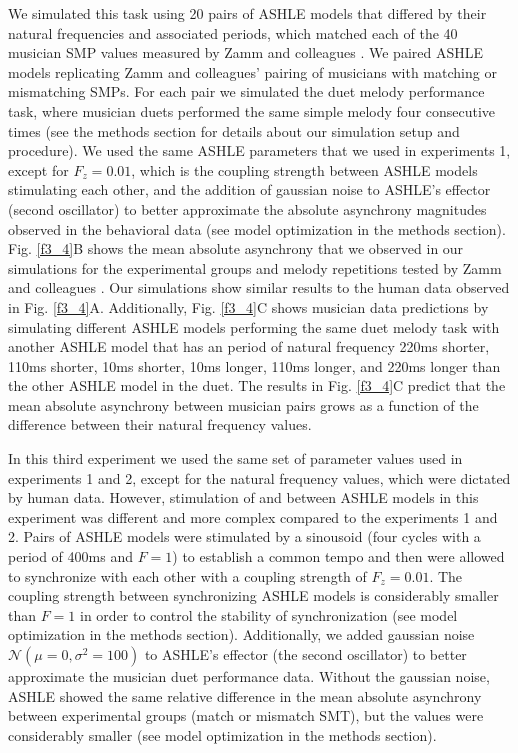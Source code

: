 \documentclass{report}
\begin{document}
We simulated this task using 20 pairs of ASHLE models that differed by their natural frequencies and associated periods, which matched each of the 40 musician SMP values measured by Zamm and colleagues \cite{zamm2016endogenous}. We paired ASHLE models replicating Zamm and colleagues' \cite{zamm2016endogenous} pairing of musicians with matching or mismatching SMPs. For each pair we simulated the duet melody performance task, where musician duets performed the same simple melody four consecutive times (see the methods section for details about our simulation setup and procedure). We used the same ASHLE parameters that we used in experiments 1, except for $F_z = 0.01$, which is the coupling strength between ASHLE models stimulating each other, and the addition of gaussian noise to ASHLE's effector (second oscillator) to better approximate the absolute asynchrony magnitudes observed in the behavioral data (see model optimization in the methods section). Fig.{} \ref{f3_4}B shows the mean absolute asynchrony that we observed in our simulations for the experimental groups and melody repetitions tested by Zamm and colleagues \cite{zamm2016endogenous}. Our simulations show similar results to the human data observed in Fig.{} \ref{f3_4}A. Additionally, Fig.{} \ref{f3_4}C shows musician data predictions by simulating different ASHLE models performing the same duet melody task with another ASHLE model that has an period of natural frequency 220ms shorter, 110ms shorter, 10ms shorter, 10ms longer, 110ms longer, and 220ms longer than the other ASHLE model in the duet. The results in Fig.{} \ref{f3_4}C predict that the mean absolute asynchrony between musician pairs grows as a function of the difference between their natural frequency values. 

In this third experiment we used the same set of parameter values used in experiments 1 and 2, except for the natural frequency values, which were dictated by human data. However, stimulation of and between ASHLE models in this experiment was different and more complex compared to the experiments 1 and 2. Pairs of ASHLE models were stimulated by a sinousoid (four cycles with a period of 400ms and $F=1$) to establish a common tempo and then were allowed to synchronize with each other with a coupling strength of $F_z=0.01$. The coupling strength between synchronizing ASHLE models is considerably smaller than $F=1$ in order to control the stability of synchronization (see model optimization in the methods section). Additionally, we added gaussian noise $\mathcal{N}(\mu=0, \sigma^2=100)$ to ASHLE's effector (the second oscillator) to better approximate the musician duet performance data. Without the gaussian noise, ASHLE showed the same relative difference in the mean absolute asynchrony between experimental groups (match or mismatch SMT), but the values were considerably smaller (see model optimization in the methods section).
\end{document}
